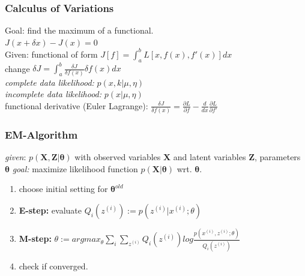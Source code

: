 \documentclass[9pt,parskip]{scrartcl}
\begin{document}
\begin{multicols*}{4}
\subsubsection*{Calculus of Variations}
Goal: find the maximum of a functional. \\
$J(x + \delta x) - J(x) = 0$ \\
Given: functional of form 
$J[f]=\int _{a}^{b} L[x,f(x),f'(x)] dx $ \\
change $\delta J = \int_a^b  \frac{\delta J}{\delta f(x)} \delta f(x) dx $ \\
\textit{complete data likelihood:} $p(x,k|\mu, \eta)$\\
\textit{incomplete data likelihood:} $p(x|\mu, \eta)$\\
functional derivative (Euler Lagrange): $\frac{\delta J}{\delta f(x)} = \frac{\partial L}{\partial f} -\frac{d}{dx} \frac{\partial L}{\partial f'} $
\subsubsection*{EM-Algorithm}
\textit{given}: $p(\mathbf{X},\mathbf{Z}|\mathbf{\theta})$ with observed variables $\mathbf{X}$ and latent variables $\mathbf{Z}$, parameters $\mathbf{\theta}$
\textit{goal:} maximize likelihood function $p(\mathbf{X}|\mathbf{\theta})$ wrt. $\mathbf{\theta}$.
\begin{enumerate}
	\item choose initial setting for $\boldsymbol{\theta}^{old}$
	\item \textbf{E-step:} evaluate 
	$Q_i(z^{(i)}) := p(z^{(i)}|x^{(i)};\theta)$
	\item \textbf{M-step:} 
	$\theta := argmax_{\theta} \sum_i \sum_{z^{(i)}} Q_i(z^{(i)})log\frac{p(x^{(i)},z^{(i)};\theta)}{Q_i(z^{(i)})}$ 
	\item check if converged.
\end{enumerate}


\end{multicols*}
\end{document}
